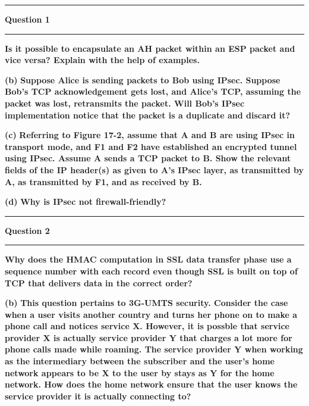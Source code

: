 \documentclass[11pt]{article}
\newcommand\question[2]{\vspace{.25in}\hrule\textbf{#1}\vspace{.5em}\hrule\vspace{.10in}}
\renewcommand\part[1]{\vspace{.10in}\textbf{(#1)}}
\begin{document}
\raggedright
\newcommand\NAME{Jake Pitkin}  %
\newcommand\UID{u0891770}     %
\newcommand\HWNUM{5}              %

\question{Question 1}

\part{a} \textbf{Is it possible to encapsulate an AH packet within an ESP packet and vice versa? Explain with the help of examples.}

\part{b} \textbf{Suppose Alice is sending packets to Bob using IPsec. Suppose Bob's TCP acknowledgement gets lost, and Alice's TCP, assuming the packet was lost, retransmits the packet. Will Bob's IPsec implementation notice that the packet is a duplicate and discard it?}

\part{c} \textbf{Referring to Figure 17-2, assume that A and B are using IPsec in transport mode, and F1 and F2 have established an encrypted tunnel using IPsec. Assume A sends a TCP packet to B. Show the relevant fields of the IP header(s) as given to A's IPsec layer, as transmitted by A, as transmitted by F1, and as received by B.}

\part{d} \textbf{Why is IPsec not firewall-friendly?}

\question{Question 2}

\part{a} \textbf{Why does the HMAC computation in SSL data transfer phase use a sequence number with each record even though SSL is built on top of TCP that delivers data in the correct order?}

\part{b} \textbf{This question pertains to 3G-UMTS security. Consider the case when a user visits another country and turns her phone on to make a phone call and notices service X. However, it is possble that service provider X is actually service provider Y that charges a lot more for phone calls made while roaming. The service provider Y when working as the intermediary between the subscriber and the user's home network appears to be X to the user by stays as Y for the home network. How does the home network ensure that the user knows the service provider it is actually connecting to?}
\end{document}
